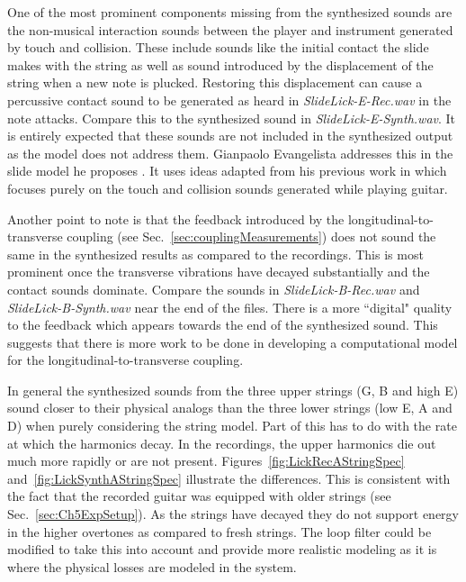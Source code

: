\documentclass[../main.tex]{subfiles}
\begin{document}
One of the most prominent components missing from the synthesized sounds are the non-musical interaction sounds between the player and instrument generated by touch and collision. These include sounds like the initial contact the slide makes with the string as well as sound introduced by the displacement of the string when a new note is plucked. Restoring this displacement can cause a percussive contact sound to be generated as heard in \emph{SlideLick-E-Rec.wav} in the note attacks. Compare this to the synthesized sound in \emph{SlideLick-E-Synth.wav}. It is entirely expected that these sounds are not included in the synthesized output as the model does not address them. Gianpaolo Evangelista addresses this in the slide model he proposes . It uses ideas adapted from his previous work in  which focuses purely on the touch and collision sounds generated while playing guitar.

Another point to note is that the feedback introduced by the longitudinal-to-transverse coupling (see Sec.~\ref{sec:couplingMeasurements}) does not sound the same in the synthesized results as compared to the recordings. This is most prominent once the transverse vibrations have decayed substantially and the contact sounds dominate. Compare the sounds in \emph{SlideLick-B-Rec.wav} and \emph{SlideLick-B-Synth.wav} near the end of the files. There is a more ``digital" quality to the feedback which appears towards the end of the synthesized sound. This suggests that there is more work to be done in developing a computational model for the longitudinal-to-transverse coupling.

In general the synthesized sounds from the three upper strings (G, B and high E) sound closer to their physical analogs than the three lower strings (low E, A and D) when purely considering the string model. Part of this has to do with the rate at which the harmonics decay. In the recordings, the upper harmonics die out much more rapidly or are not present. Figures~\ref{fig:LickRecAStringSpec} and~\ref{fig:LickSynthAStringSpec} illustrate the differences. This is consistent with the fact that the recorded guitar was equipped with older strings (see Sec.~\ref{sec:Ch5ExpSetup}). As the strings have decayed they do not support energy in the higher overtones as compared to fresh strings. The loop filter could be modified to take this into account and provide more realistic modeling as it is where the physical losses are modeled in the system.
\end{document}
